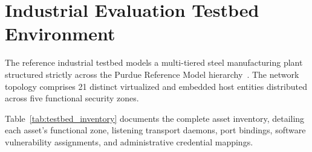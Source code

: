 \documentclass[target=mst,aauheader=aics,style=]{thud}
\begin{document}
\section{Industrial Evaluation Testbed Environment}
\label{sec:testbed_architecture}

The reference industrial testbed models a multi-tiered steel manufacturing plant structured strictly across the Purdue Reference Model hierarchy~\cite{SunderOT}. The network topology comprises 21 distinct virtualized and embedded host entities distributed across five functional security zones. 

Table~\ref{tab:testbed_inventory} documents the complete asset inventory, detailing each asset's functional zone, listening transport daemons, port bindings, software vulnerability assignments, and administrative credential mappings.
\end{document}
